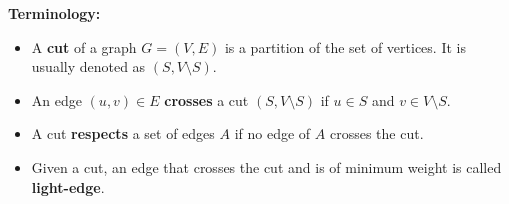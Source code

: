 \textbf{Terminology:}
\begin{itemize}
    \item A \textbf{cut} of a graph $G = (V, E)$ is a partition of the set of vertices. It is usually denoted as $(S, V \setminus S)$.

    \item An edge $(u, v) \in E$ \textbf{crosses} a cut $(S, V \setminus S)$ if $u \in S$ and $v \in V \setminus S$.

    \item A cut \textbf{respects} a set of edges $A$ if no edge of $A$ crosses the cut.

    \item Given a cut, an edge that crosses the cut and is of minimum weight is called \textbf{light-edge}.
    
\end{itemize}

